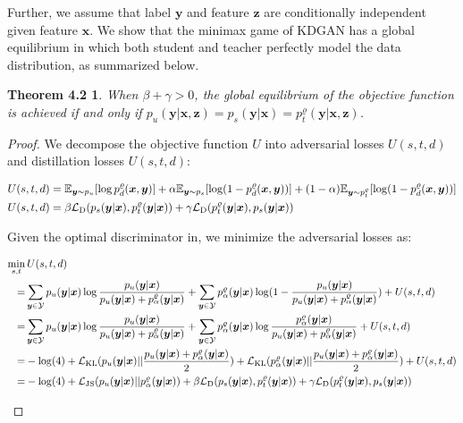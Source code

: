 \documentclass{article}
\newtheorem*{theorem1}{Theorem 4.2}
\newcommand{\OVEC}[1]{\bm{#1}} %
\newcommand{\COL}[1]{\mathcal{#1}} %
\newcommand{\LOSS}[2]{\mathcal{#1}_{\rm{#2}}} %
\newcommand{\UTIL}[1]{U(s,t,d)} %
\newcommand{\EXP}{\mathbb{E}} %
\newcommand{\DTN}{\mathcal{L}_{\rm{D}}}
\newcommand{\abbrpdat}{p_{u}}
\newcommand{\fullpdat}{p_{u}(\OVEC{y}|\OVEC{x})}
\newcommand{\abbrpstd}{p_{s}}
\newcommand{\fullpstd}[1]{p_{s}(#1|\OVEC{x})}
\newcommand{\abbrptch}{p_{t}^{\varrho}}
\newcommand{\fullptch}[1]{p_{t}^{\varrho}(#1|\OVEC{x})}
\newcommand{\fullpdis}[1]{p_{d}^{\varrho}(\OVEC{x},#1)}
\newcommand{\fullpmix}{p_{\alpha}^{\varrho}(\OVEC{y}|\OVEC{x})}
\begin{document}
Further, we assume that label $\OVEC{y}$ and feature $\OVEC{z}$ are conditionally independent given feature $\OVEC{x}$.
We show that the minimax game of KDGAN has a global equilibrium in which both student and teacher perfectly model the data distribution, as summarized below.
\begin{theorem1}
When $\beta+\gamma>0$, the global equilibrium of the objective function is achieved if and only if $\abbrpdat(\OVEC{y}|\OVEC{x},\OVEC{z})=\abbrpstd(\OVEC{y}|\OVEC{x})=\abbrptch(\OVEC{y}|\OVEC{x},\OVEC{z})$.
\end{theorem1}

\begin{proof}
We decompose the objective function $U$ into adversarial losses $\UTIL{A}$ and distillation losses $\UTIL{D}$:
\begin{small}
\begin{equation*}
\begin{aligned}
&
\UTIL{A}
=
\EXP_{\OVEC{y}\sim\abbrpdat}[\log\fullpdis{\OVEC{y}}]
+
\alpha\EXP_{\OVEC{y}\sim\abbrpstd}[\log(1-\fullpdis{\OVEC{y}})]
+
(1-\alpha)\EXP_{\OVEC{y}\sim\abbrptch}[\log(1-\fullpdis{\OVEC{y}})]
\\
&
\UTIL{D}
=
\beta\DTN(\fullpstd{\OVEC{y}},\fullptch{\OVEC{y}})
+
\gamma\DTN(\fullptch{\OVEC{y}},\fullpstd{\OVEC{y}})
\\
\end{aligned}
\end{equation*}
\end{small}%
Given the optimal discriminator in, we minimize the adversarial losses as:
\begin{small}
\begin{equation*}
\begin{aligned}
\min_{s,t}
&
\,
\UTIL{}
\\
=
&
\sum_{\OVEC{y}\in\COL{Y}}
\fullpdat\log\frac{\fullpdat}{\fullpdat+\fullpmix}
+
\sum_{\OVEC{y}\in\COL{Y}}
\fullpmix\log(1-\frac{\fullpdat}{\fullpdat+\fullpmix})
+
\UTIL{D}
\\
=
&
\sum_{\OVEC{y}\in\COL{Y}}
\fullpdat\log\frac{\fullpdat}{\fullpdat+\fullpmix}
+
\sum_{\OVEC{y}\in\COL{Y}}
\fullpmix\log\frac{\fullpmix}{\fullpdat+\fullpmix}
+
\UTIL{D}
\\
=
&
-\log(4)
+
\LOSS{L}{KL}(\fullpdat||\frac{\fullpdat+\fullpmix}{2})
+
\LOSS{L}{KL}(\fullpmix||\frac{\fullpdat+\fullpmix}{2})
+
\UTIL{D}
\\
=
&
-\log(4)
+
\LOSS{L}{JS}(\fullpdat||\fullpmix)
+
\beta\DTN(\fullpstd{\OVEC{y}},\fullptch{\OVEC{y}})
+
\gamma\DTN(\fullptch{\OVEC{y}},\fullpstd{\OVEC{y}})

\end{aligned}
\end{equation*}
\end{small}
\end{proof}
\end{document}
